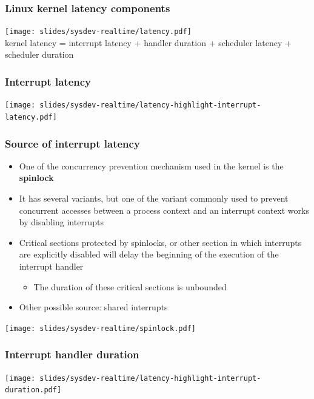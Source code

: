 \begin{frame}
  \frametitle{Linux kernel latency components}
  \begin{center}
    \texttt{[image: slides/sysdev-realtime/latency.pdf]}\\
    kernel latency = interrupt latency + handler duration + scheduler
    latency + scheduler duration
  \end{center}
\end{frame}

\begin{frame}
  \frametitle{Interrupt latency}
  \begin{center}
    \texttt{[image: slides/sysdev-realtime/latency-highlight-interrupt-latency.pdf]}
  \end{center}
\end{frame}

\begin{frame}
  \frametitle{Source of interrupt latency}
  \begin{itemize}
  \item One of the concurrency prevention mechanism used in the kernel
    is the {\bf spinlock}
  \item It has several variants, but one of the variant commonly used
    to prevent concurrent accesses between a process context and an
    interrupt context works by disabling interrupts
  \item Critical sections protected by spinlocks, or other section in
    which interrupts are explicitly disabled will delay the beginning
    of the execution of the interrupt handler
    \begin{itemize}
    \item The duration of these critical sections is unbounded
    \end{itemize}
  \item Other possible source: shared interrupts
  \end{itemize}
  \begin{center}
    \texttt{[image: slides/sysdev-realtime/spinlock.pdf]}
  \end{center}
\end{frame}

\begin{frame}
\frametitle{Interrupt handler duration}
  \begin{center}
    \texttt{[image: slides/sysdev-realtime/latency-highlight-interrupt-duration.pdf]}
  \end{center}
\end{frame}

